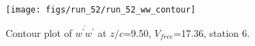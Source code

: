 \begin{figure}[H]
\centering
\texttt{[image: figs/run\_52/run\_52\_ww\_contour]}
\caption{Contour plot of $\overline{w^\prime w^\prime}$ at $z/c$=9.50, $V_{free}$=17.36, station 6.}
\end{figure}


